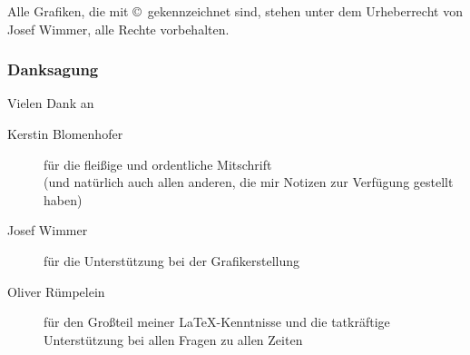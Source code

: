 Alle Grafiken, die mit \copyright ~gekennzeichnet sind, stehen unter
dem Urheberrecht von Josef Wimmer, alle Rechte vorbehalten.


\subsubsection*{Danksagung}
Vielen Dank an
\begin{description}
\item[Kerstin Blomenhofer] für die fleißige und ordentliche Mitschrift\\
  (und natürlich auch allen anderen, die mir Notizen zur Verfügung gestellt haben)
\item[Josef Wimmer] für die Unterstützung bei der Grafikerstellung
\item[Oliver Rümpelein] für den Großteil meiner \LaTeX-Kenntnisse und
  die tatkräftige Unterstützung bei allen Fragen zu allen Zeiten
\end{description}

